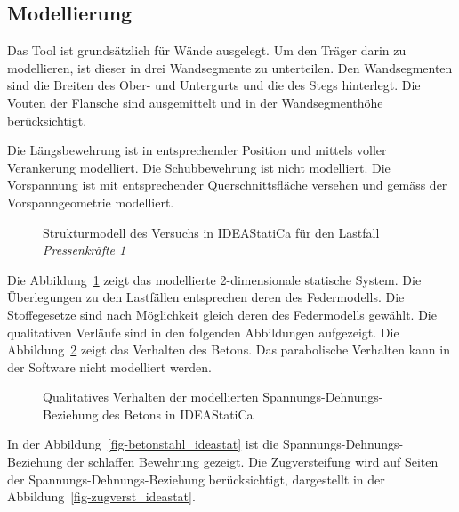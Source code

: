 \documentclass[
  11pt,
  letterpaper,
]{scrreprt}
\begin{document}
\subsection{Modellierung}\label{modellierung-3}

Das Tool ist grundsätzlich für Wände ausgelegt. Um den Träger darin zu
modellieren, ist dieser in drei Wandsegmente zu unterteilen. Den
Wandsegmenten sind die Breiten des Ober- und Untergurts und die des
Stegs hinterlegt. Die Vouten der Flansche sind ausgemittelt und in der
Wandsegmenthöhe berücksichtigt.

Die Längsbewehrung ist in entsprechender Position und mittels voller
Verankerung modelliert. Die Schubbewehrung ist nicht modelliert. Die
Vorspannung ist mit entsprechender Querschnittsfläche versehen und
gemäss der Vorspanngeometrie modelliert.

\begin{figure}[H]


\caption{\label{fig-system_ideastat}Strukturmodell des Versuchs in
IDEAStatiCa für den Lastfall \emph{Pressenkräfte 1}}

\end{figure}%

Die Abbildung~\ref{fig-system_ideastat} zeigt das modellierte
2-dimensionale statische System. Die Überlegungen zu den Lastfällen
entsprechen deren des Federmodells. Die Stoffegesetze sind nach
Möglichkeit gleich deren des Federmodells gewählt. Die qualitativen
Verläufe sind in den folgenden Abbildungen aufgezeigt. Die
Abbildung~\ref{fig-beton_ideastat} zeigt das Verhalten des Betons. Das
parabolische Verhalten kann in der Software nicht modelliert werden.

\begin{figure}[H]


\caption{\label{fig-beton_ideastat}Qualitatives Verhalten der
modellierten Spannungs-Dehnungs-Beziehung des Betons in IDEAStatiCa}

\end{figure}%

In der Abbildung~\ref{fig-betonstahl_ideastat} ist die
Spannungs-Dehnungs-Beziehung der schlaffen Bewehrung gezeigt. Die
Zugversteifung wird auf Seiten der Spannungs-Dehnungs-Beziehung
berücksichtigt, dargestellt in der
Abbildung~\ref{fig-zugverst_ideastat}.
\end{document}
